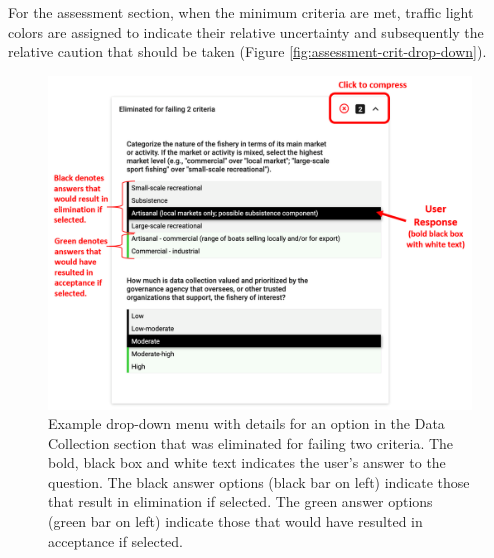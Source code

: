 \documentclass[
  11pt,
]{book}
\begin{document}
For the assessment section, when the minimum criteria are met, traffic light colors are assigned to indicate their relative uncertainty and subsequently the relative caution that should be taken (Figure \ref{fig:assessment-crit-drop-down}).

\begin{figure}

{\centering \includegraphics[width=0.75\linewidth]{images/crit-drop-down} 

}

\caption{Example drop-down menu with details for an option in the Data Collection section that was eliminated for failing two criteria. The bold, black box and white text indicates the user's answer to the question. The black answer options (black bar on left) indicate those that result in elimination if selected. The green answer options (green bar on left) indicate those that would have resulted in acceptance if selected.}\label{fig:crit-drop-down}
\end{figure}
\end{document}
